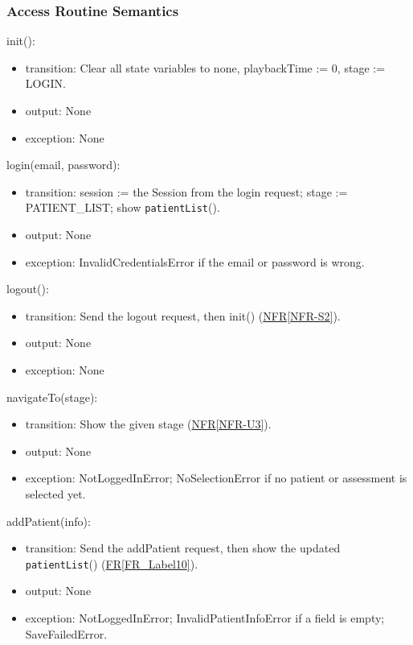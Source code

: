 \documentclass[12pt, titlepage]{article}
\newcommand{\srsref}[2]{\href{https://github.com/Nour-Fawaz/MacaBoca/blob/main/pdfs/SRS/SRS.pdf}{#1\ref*{#2}}}
\begin{document}
\subsubsection{Access Routine Semantics}

\noindent init():
\begin{itemize}
\item transition: Clear all state variables to none, playbackTime := 0, stage := LOGIN.
\item output: None
\item exception: None
\end{itemize}

\noindent login(email, password):
\begin{itemize}
\item transition: session := the Session from the login request; stage := PATIENT\_LIST; show \texttt{patientList}().
\item output: None
\item exception: InvalidCredentialsError if the email or password is wrong.
\end{itemize}

\noindent logout():
\begin{itemize}
\item transition: Send the logout request, then init() (\srsref{NFR}{NFR-S2}).
\item output: None
\item exception: None
\end{itemize}

\noindent navigateTo(stage):
\begin{itemize}
\item transition: Show the given stage (\srsref{NFR}{NFR-U3}).
\item output: None
\item exception: NotLoggedInError; NoSelectionError if no patient or assessment is selected yet.
\end{itemize}

\noindent addPatient(info):
\begin{itemize}
\item transition: Send the addPatient request, then show the updated \texttt{patientList}() (\srsref{FR}{FR_Label10}).
\item output: None
\item exception: NotLoggedInError; InvalidPatientInfoError if a field is empty; SaveFailedError.
\end{itemize}
\end{document}
